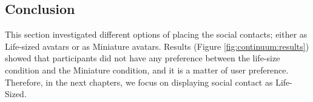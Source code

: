 \subsection{Conclusion}

This section investigated different options of placing the social contacts; either as Life-sized avatars or as Miniature avatars. Results (Figure \ref{fig:continuum:results}) showed that participants did not have any preference between the life-size condition and the Miniature condition, and it is a matter of user preference. Therefore, in the next chapters, we focus on displaying social contact as Life-Sized.

